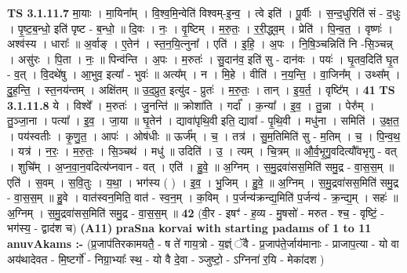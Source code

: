 \documentclass[17pt]{extarticle}
\begin{document}
                                \textbf{ TS 3.1.11.7} \newline
                  मा॒याः । मा॒यिना᳚म् । वि॒श्व॒मि॒न्वेति॑ विश्वम्-इ॒न्व॒ । त्वे इति॑ । पू॒र्वीः । स॒न्द॒धुरिति॑ सं - द॒धुः । पृ॒ष्ट॒ब॒न्धो॒ इति॑ पृष्ट - ब॒न्धो॒ ॥ दि॒वः । नः॒ । वृ॒ष्टिम् । म॒रु॒तः॒ । र॒री॒द्ध्व॒म् । प्रेति॑ । पि॒न्व॒त॒ । वृष्णः॑ । अश्व॑स्य । धाराः᳚ ॥ अ॒र्वाङ् । ए॒तेन॑ । स्त॒न॒यि॒त्नुना᳚ । एति॑ । इ॒हि॒ । अ॒पः । नि॒षि॒ञ्चन्निति॑ नि -सि॒ञ्चन्न् । असु॑रः । पि॒ता । नः॒ ॥ पिन्व॑न्ति । अ॒पः । म॒रुतः॑ । सु॒दान॑व॒ इति॑ सु - दान॑वः । पयः॑ । घृ॒तव॒दिति॑ घृ॒त - व॒त् । वि॒दथे॑षु । आ॒भुव॒ इत्या᳚ - भुवः॑ ॥ अत्य᳚म् । न । मि॒हे । वीति॑ । न॒य॒न्ति॒ । वा॒जिन᳚म् । उथ्स᳚म् । दु॒ह॒न्ति॒ । स्त॒नय॑न्तम् । अक्षि॑तम् ॥ उ॒द॒प्रुत॒ इत्यु॑द - प्रुतः॑ । म॒रु॒तः॒ । तान् । इ॒य॒र्त॒ । वृष्टि᳚म् । \textbf{  41} \newline
                  \newline
                                \textbf{ TS 3.1.11.8} \newline
                  ये । विश्वे᳚ । म॒रुतः॑ । जु॒नन्ति॑ ॥ क्रोशा॑ति । गर्दा᳚ । क॒न्या᳚ । इ॒व॒ । तु॒न्ना । पेरु᳚म् । तु॒ञ्जा॒ना । पत्या᳚ । इ॒व॒ । जा॒या ॥ घृ॒तेन॑ । द्यावा॑पृथि॒वी इति॒ द्यावा᳚ - पृ॒थि॒वी । मधु॑ना । समिति॑ । उ॒क्ष॒त॒ । पय॑स्वतीः । कृ॒णु॒त॒ । आपः॑ । ओष॑धीः ॥ ऊर्ज᳚म् । च॒ । तत्र॑ । सु॒म॒तिमिति॑ सु - म॒तिम् । च॒ । पि॒न्व॒थ॒ । यत्र॑ । न॒रः॒ । म॒रु॒तः॒ । सि॒ञ्चथ॑ । मधु॑ ॥ उदिति॑ । उ॒ । त्यम् । चि॒त्रम् ॥ औ॒र्व॒भृ॒गु॒वदित्यौ᳚वभृगु - वत् । शुचि᳚म् । अ॒प्न॒वा॒न॒वदित्य॑प्नवान - वत् । एति॑ । हु॒वे॒ ॥ अ॒ग्निम् । स॒मु॒द्रवा॑सस॒मिति॑ समु॒द्र - वा॒स॒स॒म् ॥ एति॑ । स॒वम् । स॒वि॒तुः । य॒था॒ । भग॑स्य ( ) । इ॒व॒ । भु॒जिम् । हु॒वे॒ ॥ अ॒ग्निम् । स॒मु॒द्रवा॑सस॒मिति॑ समु॒द्र - वा॒स॒स॒म् ॥ हु॒वे । वात॑स्वन॒मिति॒ वात॑ - स्व॒न॒म् । क॒विम् । प॒र्जन्य॑क्रन्द्य॒मिति॑ प॒र्जन्य॑ - क्र॒न्द्य॒म् । सहः॑ ॥ अ॒ग्निम् । स॒मु॒द्रवा॑सस॒मिति॑ समु॒द्र - वा॒स॒स॒म् ॥ \textbf{  42 } \newline
                  \newline
                      (वी॒र - इषꣳ॑ - ह॒व्य - मु॒षसो॑ - मरुत - श्च॒ - वृष्टिं॒ - भग॑स्य॒ - द्वाद॑श च)  \textbf{(A11)} \newline \newline
\textbf{praSna korvai with starting padams of 1 to 11 anuvAkams :-} \newline
(प्र॒जाप॑तिरकामयतै॒ - ष ते॑ गाय॒त्रो - य॒ज्ञ्ं ॅवै - प्र॒जाप॑ते॒र्जाय॑मानाः - प्राजाप॒त्या - यो वा अय॑थादेवत - मि॒ष्टर्गो॑ - निग्रा॒भ्याः᳚ स्थ॒ - यो वै दे॒वा - ञ्जुष्टो॒ - ऽग्निना॑ र॒यि - मेका॑दश ) \newline
\end{document}
